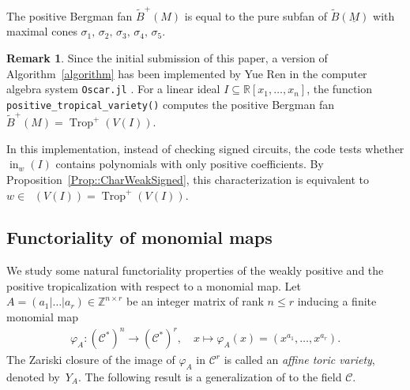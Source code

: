 \documentclass{article}
\theoremstyle{definition}
\newtheorem{remark}[theorem]{Remark}
\DeclareMathOperator{\Trop}{Trop}
\DeclareMathOperator{\Tropw}{Trop_\mathcal{C}^+}
\newcommand{\CC}{\mathcal{C}}
\newcommand{\inw}{\operatorname{in}_w}
\begin{document}
The positive Bergman fan $\widetilde{B}^+(M)$ is equal to the pure subfan of $\widetilde{B}(\underline{M})$ with maximal cones $\sigma_1,\, \sigma_2 ,\, \sigma_3 ,\, \sigma_4  ,\, \sigma_5$.

\begin{remark}
Since the initial submission of this paper, a version of Algorithm~\ref{algorithm} has been implemented by Yue Ren in the computer algebra system \texttt{Oscar.jl} \cite{OSCARbook}. For a linear ideal $I \subseteq \mathbb{R}[x_1, \dots, x_n]$, the function \texttt{positive\_tropical\_variety()} computes the positive Bergman fan $\widetilde{B}^+(M) =  \Trop^+(V(I))$.

In this implementation, instead of checking signed circuits, the code tests whether  $\inw(I)$ contains polynomials with only positive coefficients. By Proposition~\ref{Prop::CharWeakSigned}, this characterization is equivalent to $w \in \Tropw(V(I))=\Trop^+(V(I))$.
\end{remark}

\color{black}

\subsection{Functoriality of monomial maps}
\label{section: functoriality}



We study some natural functoriality properties of the weakly positive and the  positive tropicalization with respect to a monomial map. Let $A = (a_1 | \dots| a_r) \in \mathbb{Z}^{n \times r}$ be an integer matrix of rank $n \leq r$ inducing a finite monomial map
\begin{align}
\label{Eq:MonoMap}
    \varphi_A\colon (\CC^*)^n \longrightarrow (\CC^*)^r, \quad x \longmapsto \varphi_A(x) = \left(x^{a_1}, \dots, x^{a_r}\right).
\end{align}
The Zariski closure of the image of $\varphi_A$ in $\mathcal{C}^r$ is called an \emph{affine toric variety}, denoted by~$Y_A$. The following result is a generalization of \cite[Proposition 2.3]{TelenPos} to the field $\mathcal{C}$.
\end{document}
